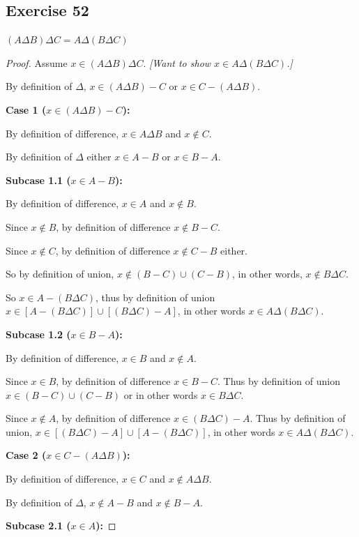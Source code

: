 \documentclass[14pt]{extarticle}
\begin{document}
\subsection{Exercise 52}
\((A \Delta B) \Delta C = A \Delta (B \Delta C)\)

\begin{proof}
Assume \(x \in (A \Delta B) \Delta C\). {\it [Want to show \(x \in A \Delta (B \Delta C)\).]}

By definition of $\Delta$, \(x \in (A \Delta B) - C\) or \(x \in C-(A \Delta B)\).

{\bf Case 1 (\(x \in (A \Delta B) - C\)):}

By definition of difference, \(x \in A \Delta B\) and \(x \notin C\).

By definition of $\Delta$ either \(x \in A - B\) or \(x \in B - A\).

{\bf Subcase 1.1 (\(x \in A-B\)):}

By definition of difference, \(x \in A\) and \(x \notin B\).

Since \(x \notin B\), by definition of difference \(x \notin B-C\).

Since \(x \notin C\), by definition of difference \(x \notin C-B\) either.

So by definition of union, \(x \notin (B-C) \cup (C-B)\), in other words, \(x \notin B \Delta C\).

So \(x \in A - (B \Delta C)\), thus by definition of union \(x \in [A - (B \Delta C)] \cup [(B \Delta C) - A]\), 
in other words \(x \in A \Delta (B \Delta C)\).

{\bf Subcase 1.2 (\(x \in B-A\)):}

By definition of difference, \(x \in B\) and \(x \notin A\).

Since \(x \in B\), by definition of difference \(x \in B-C\). Thus by definition of union \(x \in (B-C) \cup (C-B)\)
or in other words \(x \in B \Delta C\).

Since \(x \notin A\), by definition of difference \(x \in (B \Delta C) - A\). Thus by definition of union, 
\(x \in [(B \Delta C) - A] \cup [A - (B \Delta C)]\), in other words \(x \in A \Delta (B \Delta C)\).

{\bf Case 2 (\(x \in C - (A \Delta B)\)):}

By definition of difference, \(x \in C\) and \(x \notin A \Delta B\).

By definition of $\Delta$, \(x \notin A - B\) and \(x \notin B - A\).

{\bf Subcase 2.1 (\(x \in A\)):} 


\end{proof}
\end{document}
